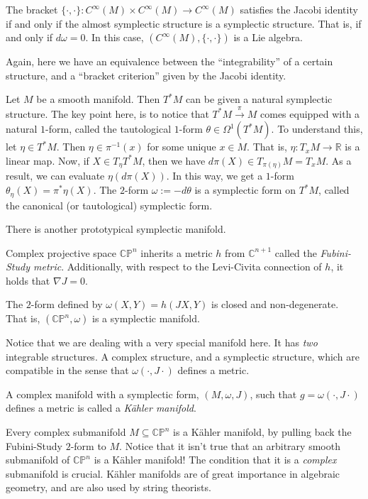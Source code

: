 \begin{theorem}
  The bracket $\{\cdot,\cdot\}:C^\infty(M)\times C^\infty(M)\to C^\infty(M)$ satisfies the Jacobi identity if and only if the almost symplectic structure is a symplectic structure. That is, if and only if $d\omega=0$. In this case, $(C^\infty(M),\{\cdot,\cdot\})$ is a Lie algebra.
\end{theorem}
Again, here we have an equivalence between the ``integrability'' of a certain structure, and a ``bracket criterion'' given by the Jacobi identity.
\begin{example}
  Let $M$ be a smooth manifold. Then $T^*M$ can be given a natural symplectic structure. The key point here, is to notice that $T^*M\xrightarrow{\pi}M$ comes equipped with a natural $1$-form, called the tautological $1$-form $\theta\in\Omega^1(T^*M)$. To understand this, let $\eta\in T^*M$. Then $\eta\in \pi^{-1}(x)$ for some unique $x\in M$. That is, $\eta:T_xM\to \mathbb{R}$ is a linear map. Now, if $X\in T_\eta T^*M$, then we have $d\pi(X)\in T_{\pi(\eta)}M=T_xM$. As a result, we can evaluate $\eta(d\pi(X))$. In this way, we get a $1$-form $\theta_\eta(X)=\pi^*\eta(X)$. The $2$-form $\omega:=-d\theta$ is a symplectic form on $T^*M$, called the canonical (or tautological) symplectic form.
\end{example}
There is another prototypical symplectic manifold.
\begin{theorem}
  Complex projective space $\mathbb{CP}^n$ inherits a metric $h$ from $\mathbb{C}^{n+1}$ called the \emph{Fubini-Study metric}. Additionally, with respect to the Levi-Civita connection of $h$, it holds that $\nabla J=0$.
\end{theorem}
\begin{corollary}
    The $2$-form defined by $\omega(X,Y)=h(JX,Y)$ is closed and non-degenerate. That is, $(\mathbb{CP}^n, \omega)$ is a symplectic manifold.
\end{corollary}
Notice that we are dealing with a very special manifold here. It has \textit{two} integrable structures. A complex structure, and a symplectic structure, which are compatible in the sense that $\omega(\cdot, J\cdot)$ defines a metric.
\begin{definition}
    A complex manifold with a symplectic form, $(M,\omega, J)$, such that $g=\omega(\cdot, J\cdot)$ defines a metric is called a \emph{Kähler manifold}.
\end{definition}
\begin{example}
    Every complex submanifold $M\subseteq\mathbb{CP}^n$ is a Kähler manifold, by pulling back the Fubini-Study $2$-form to $M$. Notice that it isn't true that an arbitrary smooth submanifold of $\mathbb{CP}^n$ is a Kähler manifold! The condition that it is a \textit{complex} submanifold is crucial. Kähler manifolds are of great importance in algebraic geometry, and are also used by string theorists.
\end{example}
